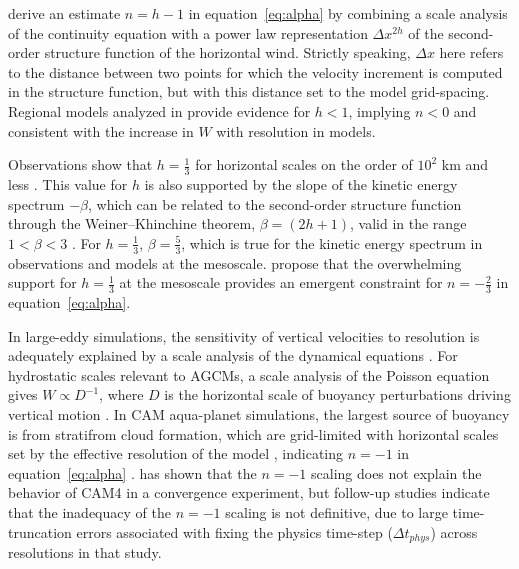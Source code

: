 \documentclass[times]{qjrms4}
\begin{document}
\cite{RETAL2016CD} derive an estimate $n= h-1$ in equation~\ref{eq:alpha} by combining a scale analysis of the continuity equation with a power law representation $\Delta x^{2h}$ of the second-order structure function of the horizontal wind. Strictly speaking, $\Delta x$ here refers to the distance between two points for which the velocity increment is computed in the structure function, but with this distance set to the model grid-spacing. Regional models analyzed in \cite{RETAL2016CD} provide evidence for $h<1$, implying $n<0$ and consistent with the increase in $W$ with resolution in models.

Observations show that $h=\frac{1}{3}$ for horizontal scales on the order of $10^2$ km and less \citep[hereafter referred to as the {\em{mesoscale}};][]{L1999JFM,CL2001JGR}. This value for $h$ is also supported by the slope of the kinetic energy spectrum $-\beta$, which can be related to the second-order structure function through the Weiner–Khinchine theorem, $\beta = \left( 2h+1 \right)$, valid in the range $1<\beta<3$ \citep[satisfies stationarity;][]{DETAL1996JAS}. For $h=\frac{1}{3}$, $\beta=\frac{5}{3}$, which is true for the kinetic energy spectrum in observations \citep{NG1985JAS,CETAL1999JGR} and models \citep[e.g.,][]{THO2006GRL,SPKS2014JAS} at the mesoscale. \cite{RETAL2016CD} propose that the overwhelming support for $h=\frac{1}{3}$ at the mesoscale provides an emergent constraint for $n=-\frac{2}{3}$ in equation~\ref{eq:alpha}.

In large-eddy simulations, the sensitivity of vertical velocities to resolution is adequately explained by a scale analysis of the dynamical equations \citep{WETAL1997MWR,PG2006JAS,JR2016QJRMS}. For hydrostatic scales relevant to AGCMs, a scale analysis of the Poisson equation gives $W \propto D^{-1}$, where $D$ is the horizontal scale of buoyancy perturbations driving vertical motion \citep{HR2018JAMES}. In CAM aqua-planet simulations, the largest source of buoyancy is from stratifrom cloud formation, which are grid-limited with horizontal scales set by the effective resolution of the model \citep[i.e., some multiple of $\Delta x$;][]{S2011LNCSE}, indicating $n=-1$ in equation~\ref{eq:alpha} \citep{HR2018JAMES}. \cite{HR2017JCLIM} has shown that the $n=-1$ scaling does not explain the behavior of CAM4 in a convergence experiment, but follow-up studies \citep{HR2018JAMES,HETAL2019JAMES} indicate that the inadequacy of the $n=-1$ scaling is not definitive, due to large time-truncation errors associated with fixing the physics time-step ($\Delta t_{phys}$) across resolutions in that study.
\end{document}
